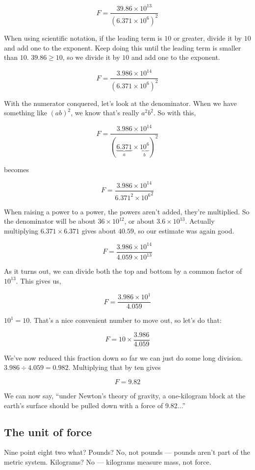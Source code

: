 \documentclass[10pt,twocolumn,letterpaper,preprint]{article}
\begin{document}
\[
F = \frac{39.86 \times 10^{13}}{(6.371 \times 10^6)^2}
\]

When using scientific notation, if the leading term is $10$ or greater, divide
it by $10$ and add one to the exponent.  Keep doing this until the leading term
is smaller than $10$.  \mbox{$39.86 \geq 10$,} so we divide it by $10$ and add one to
the exponent.

\[
F = \frac{3.986 \times 10^{14}}{(6.371 \times 10^6)^2}
\]

With the numerator conquered, let's look at the denominator.  When we have
something like $(ab)^2$, we know that's really $a^2b^2$.  So with this,

\[
F = \frac{3.986 \times 10^{14}}{(\underbrace{6.371}_{a} \times
\underbrace{10^6}_{b})^2}
\]

becomes

\[
F = \frac{3.986 \times 10^{14}}{6.371^2 \times {10^6}^2}
\]

When raising a power to a power, the powers aren't added, they're multiplied.
So the denominator will be about $36 \times 10^{12}$, or about $3.6 \times
10^{13}$.  Actually multiplying $6.371 \times 6.371$ gives about $40.59$, so
our estimate was again good.

\[
F = \frac{3.986 \times 10^{14}}{4.059 \times 10^{13}}
\]

As it turns out, we can divide both the top and bottom by a common factor of
$10^{13}$.  This gives us,

\[
F = \frac{3.986 \times 10^1}{4.059}
\]

$10^1 = 10$.  That's a nice convenient number to move out, so let's do that:

\[
F = 10 \times \frac{3.986}{4.059}
\]

We've now reduced this fraction down so far we can just do some long division.
$3.986 \div 4.059 = 0.982$.  Multiplying that by ten gives

\[
F = 9.82
\]

We can now say, ``under Newton's theory of gravity, a one-kilogram block at
the earth's surface should be pulled down with a force of 9.82...''

\subsection{The unit of force}

Nine point eight two what?  Pounds?  No, not pounds --- pounds aren't part of
the metric system.  Kilograms?  No --- kilograms measure mass, not force.
\end{document}

